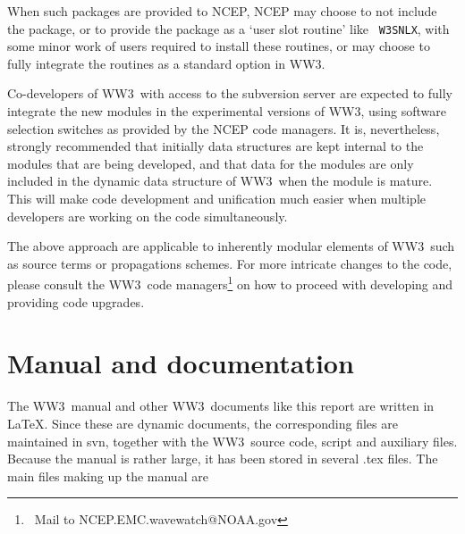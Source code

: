 \documentclass[12pt]{article}
\newcommand{\ws}{WW3}
\newcommand{\file}{\sf}
\newcommand{\code}{\tt}
\newcommand{\pb}{\strut \vfill \pagebreak}
\newcommand{\bpage}{\vfill \pagebreak \strut

\vspace{2.5in} \centerline{This page is intentionally left blank.}}
\newcommand{\newsec}{\setcounter{equation}{0}
                      \setcounter{myfigno}{0}
                      \setcounter{mytabno}{0}}
\newcounter{myfigno}[section]
\newcounter{mytabno}[section]
\begin{document}
\noindent
When such packages are provided to NCEP, NCEP may choose to not include the
package, or to provide the package as a `user slot routine' like {\code
W3SNLX}, with some minor work of users required to install these routines, or
may choose to fully integrate the routines as a standard option in \ws.

\vspace{\baselineskip} \noindent Co-developers of \ws\ with access to the
subversion server are expected to fully integrate the new modules in the
experimental versions of \ws, using software selection switches as provided by
the NCEP code managers. It is, nevertheless, strongly recommended that
initially data structures are kept internal to the modules that are being
developed, and that data for the modules are only included in the dynamic data
structure of \ws\ when the module is mature. This will make code development
and unification much easier when multiple developers are working on the code
simultaneously.

\vspace{\baselineskip} \noindent The above approach are applicable to
inherently modular elements of \ws\ such as source terms or propagations
schemes. For more intricate changes to the code, please consult the \ws\ code
managers\footnote{~Mail to NCEP.EMC.wavewatch@NOAA.gov} on how to proceed with
developing and providing code upgrades.


\pb
\section{Manual and documentation} \label{sec:man}
\newsec

The \ws\ manual and other \ws\ documents like this report are written in
\LaTeX. Since these are dynamic documents, the corresponding files are
maintained in svn, together with the \ws\ source code, script and auxiliary
files. Because the manual is rather large, it has been stored in several
{\file .tex} files. The main files making up the manual are
\end{document}
